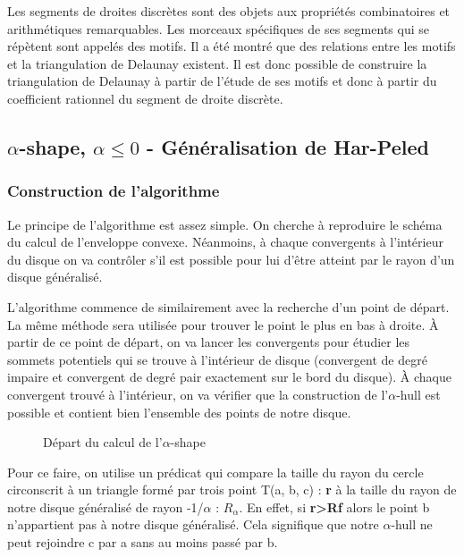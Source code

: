 Les segments de droites discrètes sont des objets aux propriétés combinatoires et arithmétiques remarquables. Les morceaux spécifiques de ses segments qui se répètent sont appelés des motifs. Il a été montré que des relations entre les motifs et la triangulation de Delaunay existent. Il est donc possible de construire la triangulation de Delaunay à partir de l'étude de ses motifs et donc à partir du coefficient rationnel du segment de droite discrète.


\subsection{$\alpha$-shape, $\alpha \leq 0$ - Généralisation de Har-Peled}

\subsubsection{Construction de l'algorithme}

Le principe de l’algorithme est assez simple. On cherche à reproduire le schéma du calcul de l’enveloppe convexe. Néanmoins, à chaque convergents à l'intérieur du disque on va contrôler s'il est possible pour lui d'être atteint par le rayon d'un disque généralisé. 

L'algorithme commence de similairement avec la recherche d'un point de départ. La même méthode sera utilisée pour trouver le point le plus en bas à droite.
À partir de ce point de départ, on va lancer les convergents pour étudier les sommets potentiels qui se trouve à l'intérieur de disque (convergent de degré impaire et convergent de degré pair exactement sur le bord du disque). À chaque convergent trouvé à l'intérieur, on va vérifier que la construction de l'$\alpha$-hull est possible et contient bien l'ensemble des points de notre disque. 

\begin{figure}[h!]
  \centering
  \caption{Départ du calcul de l'$\alpha$-shape}
\end{figure}

Pour ce faire, on utilise un prédicat qui compare la taille du rayon du cercle circonscrit à un triangle formé par trois point T(a, b, c) : \textbf{r} à la taille du rayon de notre disque généralisé de rayon -1/$\alpha$ : \textbf{$R_{\alpha}$}. En effet, si \textbf{r>Rf} alors le point b n'appartient pas à notre disque généralisé. Cela signifique que notre $\alpha$-hull ne peut rejoindre c par a sans au moins passé par b.


